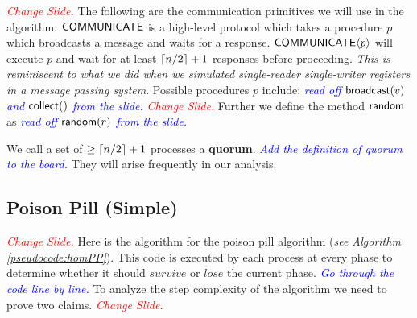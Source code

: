 \documentclass[
10pt, %
letterpaper, %
onecolumn, %
]{article}
\begin{document}
\textcolor{red}{\emph{Change Slide.}} The following are the communication primitives we will use in the algorithm. $\mathsf{COMMUNICATE}$ is a high-level protocol which takes a procedure $p$ which broadcasts a message and waits for a response. $\mathsf{COMMUNICATE}\langle p\rangle$ will execute $p$ and wait for at least $\lceil n/2\rceil+1$ responses before proceeding. \emph{This is reminiscent to what we did when we simulated single-reader single-writer registers in a message passing system}. Possible procedures $p$ include: \textcolor{blue}{\emph{read off $\mathsf{broadcast}(v)$ and $\mathsf{collect}()$ from the slide.}} \textcolor{red}{\emph{Change Slide.}} Further we define the method $\mathsf{random}$ as \textcolor{blue}{\emph{read off $\mathsf{random}(r)$ from the slide.}}
\begin{comment}
\begin{enumerate}
\item[$\broadcast(v)$:] process $p_i$ broadcasts value $v$ to all other processes (including itself). If process $p_j$ receives $\broadcast{v}$ from $p_i$, it updates $S_j[i] \leftarrow v$.
\item[$\collect()$:] process $p_i$ sends a collect message to all other processes (including itself). If process $p_j$ receives $\collect()$ from $p_i$, it sends message $\anglebrac{S_j}$ to $p_i$. 
\item[$\random(p)$:] (local operation) process $p_i$ receives $1$ with probability $p$ and $0$ otherwise. 
\end{enumerate}

What we want is an algorithm which iteratively reduces the number of participating processes. At each round processes flip a random coin and output $lose$ or $survive$ depending on the result. Surviving processes will try again in the next round. A na\"{i}ve implementation would fail since the adversary can schedule the ``losing'' processes first.
\end{comment}

We call a set of $\geq \lceil n/2\rceil+1$ processes a \textbf{quorum}. \textcolor{blue}{\emph{Add the definition of quorum to the board.}} They will arise frequently in our analysis.  

\subsection{Poison Pill (Simple)}
\textcolor{red}{\emph{Change Slide.}} Here is the algorithm for the poison pill algorithm (\emph{see Algorithm \ref{pseudocode:homPP}}). This code is executed by each process at every phase to determine whether it should $survive$ or $lose$ the current phase. \textcolor{blue}{\emph{Go through the code line by line.}} To analyze the step complexity of the algorithm we need to prove two claims. \textcolor{red}{\emph{Change Slide.}}
\end{document}
